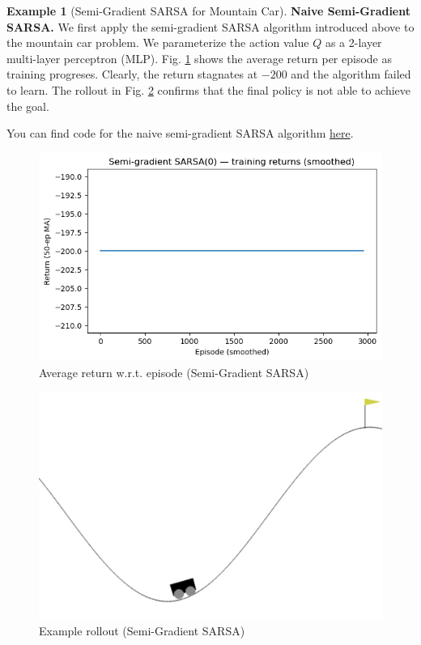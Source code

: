 \documentclass[
]{book}
\theoremstyle{definition}
\theoremstyle{definition}
\newtheorem{example}{Example}[chapter]
\theoremstyle{definition}
\theoremstyle{definition}
\theoremstyle{remark}
\begin{document}
\begin{example}[Semi-Gradient SARSA for Mountain Car]
\textbf{Naive Semi-Gradient SARSA.} We first apply the semi-gradient SARSA algorithm introduced above to the mountain car problem. We parameterize the action value \(Q\) as a 2-layer multi-layer perceptron (MLP). Fig. \ref{fig:Mountain-car-sarsa-episode-return} shows the average return per episode as training progreses. Clearly, the return stagnates at \(-200\) and the algorithm failed to learn. The rollout in Fig. \ref{fig:Mountain-car-sarsa-rollout} confirms that the final policy is not able to achieve the goal.

You can find code for the naive semi-gradient SARSA algorithm \href{https://github.com/ComputationalRobotics/2025-ES-AM-158-LECTURE-CODE/blob/main/mountaincar_sarsa.py}{here}.

\begin{figure}

{\centering \includegraphics[width=0.6\linewidth]{images/Value-RL/mountain-car_sarsa_eps3000_seed50_returns} 

}

\caption{Average return w.r.t. episode (Semi-Gradient SARSA)}\label{fig:Mountain-car-sarsa-episode-return}
\end{figure}

\begin{figure}

{\centering \includegraphics[width=0.6\linewidth]{images/Value-RL/mountain-car_sarsa_eps3000_seed50_greedy-episode-0} 

}

\caption{Example rollout (Semi-Gradient SARSA)}\label{fig:Mountain-car-sarsa-rollout}
\end{figure}


\end{example}
\end{document}
